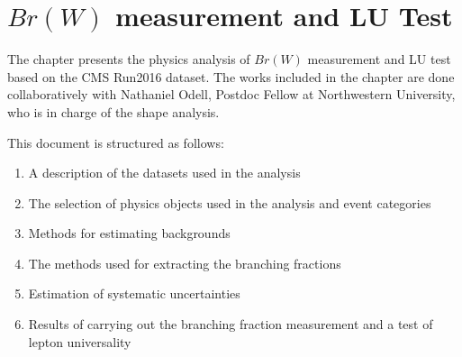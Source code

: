 \chapter{$Br(W)$ measurement and LU Test}
\label{sec:analysis}


The chapter presents the physics analysis of $Br(W)$ measurement and LU test based on the CMS Run2016 dataset. 
The works included in the chapter are done collaboratively with Nathaniel Odell, Postdoc Fellow at Northwestern University, 
who is in charge of the shape analysis. 





This document is structured as follows:

\begin{enumerate}
    \item A description of the datasets used in the analysis
    \item The selection of physics objects used in the analysis and event categories
    \item Methods for estimating backgrounds
    \item The methods used for extracting the branching fractions
    \item Estimation of systematic uncertainties
    \item Results of carrying out the branching fraction measurement and a test of lepton universality
\end{enumerate}
    
    





